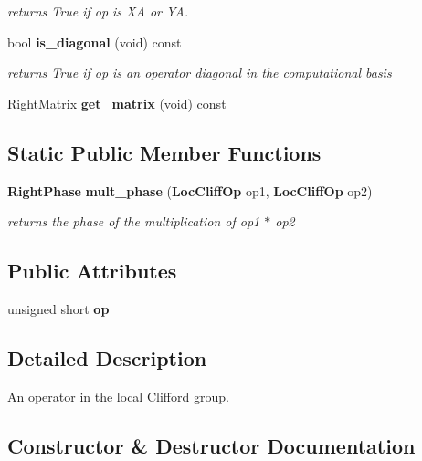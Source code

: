 \begin{CompactItemize}
\begin{CompactList}\small\item\em returns True if op is XA or YA. \item\end{CompactList}\item 
bool {\bf is\_\-diagonal} (void) const \label{structLocCliffOp_a6}

\begin{CompactList}\small\item\em returns True if op is an operator diagonal in the computational basis \item\end{CompactList}\item 
Right\-Matrix {\bf get\_\-matrix} (void) const \label{structLocCliffOp_a7}

\end{CompactItemize}
\subsection*{Static Public Member Functions}
\begin{CompactItemize}
\item 
{\bf Right\-Phase} {\bf mult\_\-phase} ({\bf Loc\-Cliff\-Op} op1, {\bf Loc\-Cliff\-Op} op2)\label{structLocCliffOp_e0}

\begin{CompactList}\small\item\em returns the phase of the multiplication of op1 $\ast$ op2 \item\end{CompactList}\end{CompactItemize}
\subsection*{Public Attributes}
\begin{CompactItemize}
\item 
unsigned short {\bf op}
\end{CompactItemize}


\subsection{Detailed Description}
An operator in the local Clifford group. 



\subsection{Constructor \& Destructor Documentation}
